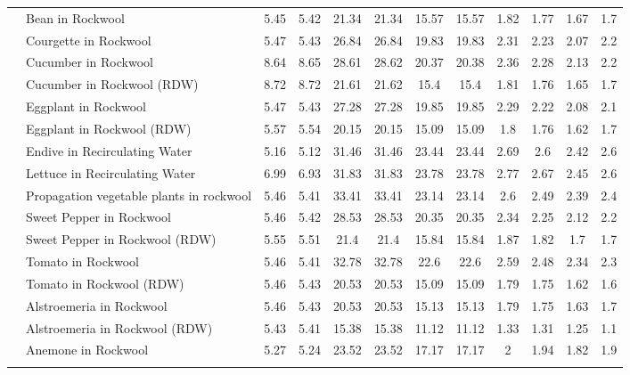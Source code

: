 \documentclass[
  letterpaper,
  DIV=11,
  numbers=noendperiod]{scrreprt}
\begin{document}
\begin{landscape}
\begin{longtable}[t]{llcccccccccc}
\endfoot
\bottomrule
\endlastfoot
 & Bean in Rockwool & 5.45 & 5.42 & 21.34 & 21.34 & 15.57 & 15.57 & 1.82 & 1.77 & 1.67 & 1.7\\
\nopagebreak
 & Courgette in Rockwool & 5.47 & 5.43 & 26.84 & 26.84 & 19.83 & 19.83 & 2.31 & 2.23 & 2.07 & 2.2\\
\nopagebreak
 & Cucumber in Rockwool & 8.64 & 8.65 & 28.61 & 28.62 & 20.37 & 20.38 & 2.36 & 2.28 & 2.13 & 2.2\\
\nopagebreak
 & Cucumber in Rockwool (RDW) & 8.72 & 8.72 & 21.61 & 21.62 & 15.4 & 15.4 & 1.81 & 1.76 & 1.65 & 1.7\\
\nopagebreak
 & Eggplant in Rockwool & 5.47 & 5.43 & 27.28 & 27.28 & 19.85 & 19.85 & 2.29 & 2.22 & 2.08 & 2.1\\
\nopagebreak
 & Eggplant in Rockwool (RDW) & 5.57 & 5.54 & 20.15 & 20.15 & 15.09 & 15.09 & 1.8 & 1.76 & 1.62 & 1.7\\
\nopagebreak
 & Endive in Recirculating Water & 5.16 & 5.12 & 31.46 & 31.46 & 23.44 & 23.44 & 2.69 & 2.6 & 2.42 & 2.6\\
\nopagebreak
 & Lettuce in Recirculating Water & 6.99 & 6.93 & 31.83 & 31.83 & 23.78 & 23.78 & 2.77 & 2.67 & 2.45 & 2.6\\
\nopagebreak
 & Propagation vegetable plants in rockwool & 5.46 & 5.41 & 33.41 & 33.41 & 23.14 & 23.14 & 2.6 & 2.49 & 2.39 & 2.4\\
\nopagebreak
 & Sweet Pepper in Rockwool & 5.46 & 5.42 & 28.53 & 28.53 & 20.35 & 20.35 & 2.34 & 2.25 & 2.12 & 2.2\\
\nopagebreak
 & Sweet Pepper in Rockwool (RDW) & 5.55 & 5.51 & 21.4 & 21.4 & 15.84 & 15.84 & 1.87 & 1.82 & 1.7 & 1.7\\
\nopagebreak
 & Tomato in Rockwool & 5.46 & 5.41 & 32.78 & 32.78 & 22.6 & 22.6 & 2.59 & 2.48 & 2.34 & 2.3\\
\nopagebreak
\multirow[t]{-13}{*}{\raggedright\arraybackslash Olericulture} & Tomato in Rockwool (RDW) & 5.46 & 5.43 & 20.53 & 20.53 & 15.09 & 15.09 & 1.79 & 1.75 & 1.62 & 1.6\\
\cmidrule{1-12}\pagebreak[0]
 & Alstroemeria in Rockwool & 5.46 & 5.43 & 20.53 & 20.53 & 15.13 & 15.13 & 1.79 & 1.75 & 1.63 & 1.7\\
\nopagebreak
 & Alstroemeria in Rockwool (RDW) & 5.43 & 5.41 & 15.38 & 15.38 & 11.12 & 11.12 & 1.33 & 1.31 & 1.25 & 1.1\\
\nopagebreak
 & Anemone in Rockwool & 5.27 & 5.24 & 23.52 & 23.52 & 17.17 & 17.17 & 2 & 1.94 & 1.82 & 1.9\\
\nopagebreak

\end{longtable}
\end{landscape}
\end{document}
